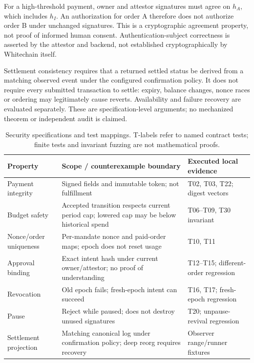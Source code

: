 \documentclass[11pt]{article}
\begin{document}
For a high-threshold payment, owner and attestor signatures must agree on $h_A$, which includes $h_I$. An authorization for order A therefore does not authorize order B under unchanged signatures. This is a cryptographic agreement property, not proof of informed human consent. Authentication-subject correctness is asserted by the attestor and backend, not established cryptographically by Whitechain itself.

Settlement consistency requires that a returned settled status be derived from a matching observed event under the configured confirmation policy. It does not require every submitted transaction to settle: expiry, balance changes, nonce races or ordering may legitimately cause reverts. Availability and failure recovery are evaluated separately. These are specification-level arguments; no mechanized theorem or independent audit is claimed.

\begin{table}[htbp]\centering\small
\begin{tabular}{p{.22\linewidth}p{.40\linewidth}p{.28\linewidth}}\toprule
Property & Scope / counterexample boundary & Executed local evidence\\\midrule
Payment integrity & Signed fields and immutable token; not fulfillment & T02, T03, T22; digest vectors\\
Budget safety & Accepted transition respects current period cap; lowered cap may be below historical spend & T06--T09, T30 invariant\\
Nonce/order uniqueness & Per-mandate nonce and paid-order maps; epoch does not reset usage & T10, T11\\
Approval binding & Exact intent hash under current owner/attestor; no proof of understanding & T12--T15; different-order regression\\
Revocation & Old epoch fails; fresh-epoch intent can succeed & T16, T17; fresh-epoch regression\\
Pause & Reject while paused; does not destroy unused signatures & T20; unpause-revival regression\\
Settlement projection & Matching canonical log under confirmation policy; deep reorg requires recovery & Observer range/runner fixtures\\\bottomrule
\end{tabular}
\caption{Security specifications and test mappings. T-labels refer to named contract tests; finite tests and invariant fuzzing are not mathematical proofs.}\label{tab:properties}
\end{table}
\end{document}

